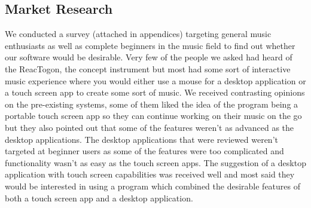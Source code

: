 \documentclass[10pt,a4paper]{article}
\begin{document}
\subsection{Market Research}
We conducted a survey (attached in appendices) targeting general music enthusiasts as well as complete beginners in the music field to find out whether our software would be desirable. Very few of the people we asked had heard of the ReacTogon, the concept instrument but most had some sort of interactive music experience where you would either use a mouse for a desktop application or a touch screen app to create some sort of music. We received contrasting opinions on the pre-existing systems, some of them liked the idea of the program being a portable touch screen app so they can continue working on their music on the go but they also pointed out that some of the features weren’t as advanced as the desktop applications. The desktop applications that were reviewed weren’t targeted at beginner users as some of the features were too complicated and functionality wasn’t as easy as the touch screen apps. The suggestion of a desktop application with touch screen capabilities was received well and most said they would be interested in using a program which combined the desirable features of both a touch screen app and a desktop application. 
\end{document}
